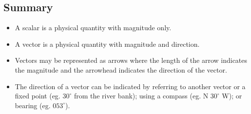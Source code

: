 \subsection*{Summary}
\begin{itemize}
\item A scalar is a physical quantity with magnitude only.
\item A vector is a physical quantity with magnitude and direction.
\item Vectors may be represented as arrows where the length of the arrow indicates the magnitude and the arrowhead indicates the direction of the vector.
\item The direction of a vector can be indicated by referring to another vector or a fixed point (eg. $30^{\circ}$ from the river bank); using a compass (eg. N $30^\circ$ W); or bearing (eg. $053 ^\circ$).
\end{itemize}
